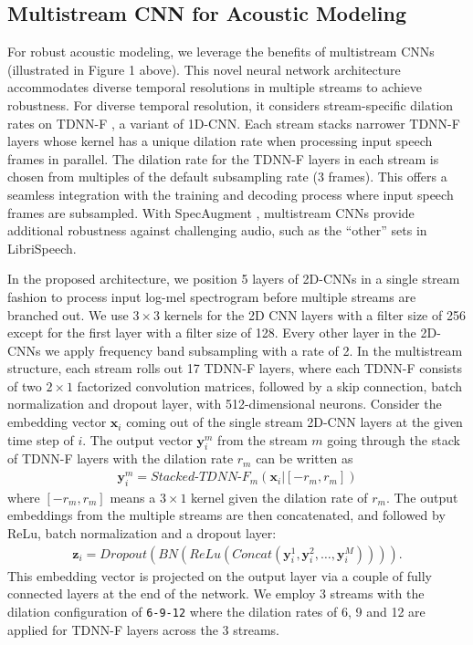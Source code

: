 \documentclass[a4paper]{article}
\begin{document}
\subsection{Multistream CNN for Acoustic Modeling}
For robust acoustic modeling, we leverage the benefits of multistream CNNs \cite{han20} (illustrated in Figure 1 above). This novel neural network architecture accommodates diverse temporal resolutions in multiple streams to achieve robustness. For diverse temporal resolution, it considers stream-specific dilation rates on TDNN-F \cite{povey18tdnnf}, a variant of 1D-CNN. Each stream stacks narrower TDNN-F layers whose kernel has a unique dilation rate when processing input speech frames in parallel. The dilation rate for the TDNN-F layers in each stream is chosen from multiples of the default subsampling rate (3 frames). This offers a seamless integration with the training and decoding process where input speech frames are subsampled. With SpecAugment \cite{specaugment}, multistream CNNs provide additional robustness against challenging audio, such as the ``other'' sets in LibriSpeech. 

In the proposed architecture, we position 5 layers of 2D-CNNs in a single stream fashion to process input log-mel spectrogram before multiple streams are branched out. We use $3 \times 3$ kernels for the 2D CNN layers with a filter size of 256 except for the first layer with a filter size of 128. Every other layer in the 2D-CNNs we apply frequency band subsampling with a rate of 2. In the multistream structure, each stream rolls out 17 TDNN-F layers, where each TDNN-F consists of two $2 \times 1$ factorized convolution matrices, followed by a skip connection, batch normalization and dropout layer, with 512-dimensional neurons. Consider the embedding vector $\mathbf{x}_i$ coming out of the single stream 2D-CNN layers at the given time step of $i$. The output vector $\mathbf{y}^m_i$ from the stream $m$ going through the stack of TDNN-F layers with the dilation rate $r_m$ can be written as
\begin{align}
    \mathbf{y}^m_i = \textit{Stacked-TDNN-F}_m \left( \mathbf{x}_i | \left[ -r_m, r_m \right] \right)
\end{align}
where $[ -r_m, r_m]$ means a $3 \times 1$ kernel given the dilation rate of $r_m$. The output embeddings from the multiple streams are then concatenated, and followed by ReLu, batch normalization and a dropout layer:
\begin{align}
    \mathbf{z}_i = \textit{Dropout} \left( \textit{BN} \left( \textit{ReLu} \left( \textit{Concat} \left( \mathbf{y}^1_i, \mathbf{y}^2_i, \dots, \mathbf{y}^M_i \right) \right) \right) \right).
\end{align}
This embedding vector is projected on the output layer via a couple of fully connected layers at the end of the network. We employ 3 streams with the dilation configuration of \texttt{6-9-12} where the dilation rates of 6, 9 and 12 are applied for TDNN-F layers across the 3 streams.     
\end{document}
